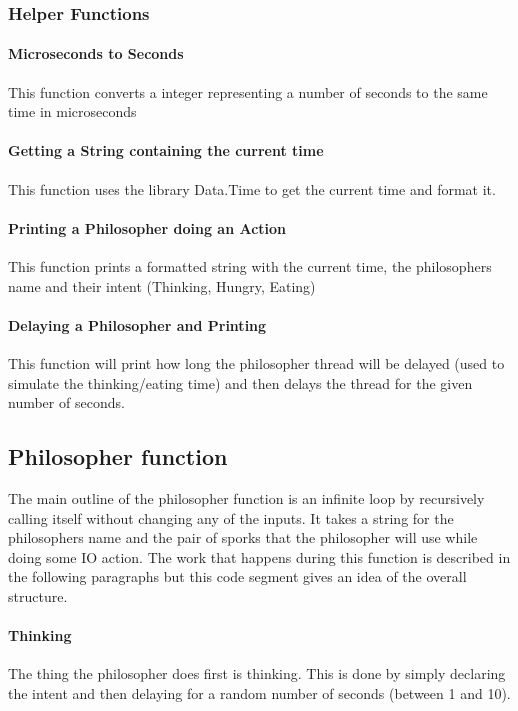 \documentclass[a4paper]{article}
\begin{document}
\subsubsection{Helper Functions}
\paragraph{Microseconds to Seconds}
This function converts a integer representing a number of seconds to the same time in microseconds

\paragraph{Getting a String containing the current time}
This function uses the library Data.Time to get the current time and format it.

\paragraph{Printing a Philosopher doing an Action}
This function prints a formatted string with the current time, the philosophers name and their intent (Thinking, Hungry, Eating)

\paragraph{Delaying a Philosopher and Printing}
This function will print how long the philosopher thread will be delayed (used to simulate the thinking/eating time) and then delays the thread for the given number of seconds.


\subsection{Philosopher function}
The main outline of the philosopher function is an infinite loop by recursively calling itself without changing any of the inputs.
It takes a string for the philosophers name and the pair of sporks that the philosopher will use while doing some IO action.
The work that happens during this function is described in the following paragraphs but this code segment gives an idea of the overall structure.

\paragraph{Thinking}
The thing the philosopher does first is thinking.
This is done by simply declaring the intent and then delaying for a random number of seconds (between 1 and 10).

\end{document}
